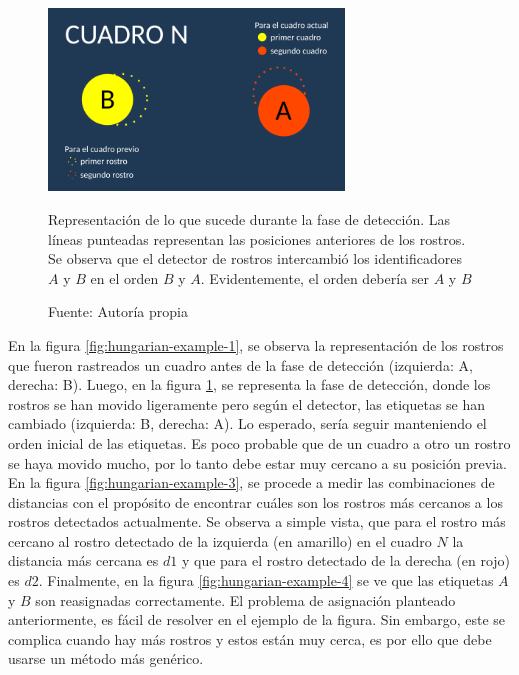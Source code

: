 \documentclass[a4paper,openright,12pt]{report}
\begin{document}
\begin{figure}[!h]
  \centering
    \includegraphics[width=0.7\textwidth]{../images/hungarian-example-2.png}\par
  \caption{Representación de lo que sucede durante la fase de detección. Las
           líneas punteadas representan las posiciones anteriores de los
           rostros. Se observa que el detector de rostros intercambió los
           identificadores $A$ y $B$ en el orden $B$ y $A$. Evidentemente,
           el orden debería ser $A$ y $B$}
    \label{fig:hungarian-example-2}
  \caption*{Fuente: Autoría propia}
\end{figure}

En la figura \ref{fig:hungarian-example-1},
se observa la representación de los rostros que fueron rastreados un cuadro
antes de la fase de detección (izquierda: A, derecha: B). Luego, en la figura
\ref{fig:hungarian-example-2}, se representa la fase
de detección, donde los rostros se han movido ligeramente pero según el
detector, las etiquetas se han cambiado (izquierda: B, derecha: A). Lo esperado,
sería seguir manteniendo el orden inicial de las etiquetas. Es poco probable que
de un cuadro a otro un rostro se haya movido mucho, por lo tanto debe estar muy
cercano a su posición previa. En la figura \ref{fig:hungarian-example-3}, se
procede a medir las combinaciones de distancias con el propósito de encontrar
cuáles son los rostros más cercanos a los rostros detectados actualmente. Se
observa a simple vista, que para el rostro más cercano al rostro detectado de la
izquierda (en amarillo) en el cuadro $N$ la distancia más cercana es $d1$ y que
para el rostro detectado de la derecha (en rojo) es $d2$. Finalmente, en la
figura \ref{fig:hungarian-example-4} se ve que las etiquetas $A$ y $B$ son
reasignadas correctamente. El problema de asignación planteado anteriormente, es
fácil de resolver en el ejemplo de la figura. Sin embargo, este se complica
cuando hay más rostros y estos están muy cerca, es por ello que debe usarse un
método más genérico.\\
\end{document}
